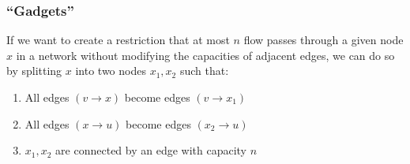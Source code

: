 \documentclass[12pt]{extarticle}
\theoremstyle{definition}
\theoremstyle{remark}
\begin{document}
\begin{center}
\end{center}

\subsubsection{``Gadgets''}
If we want to create a restriction that at most $n$ flow passes through a given node $x$ in a network without modifying the capacities of adjacent edges, we can do so by splitting $x$ into two nodes $x_1,x_2$ such that:\begin{enumerate}
    \item All edges $(v\to x)$ become edges $(v\to x_1)$
    \item All edges $(x\to u)$ become edges $(x_2\to u)$
    \item $x_1,x_2$ are connected by an edge with capacity $n$
\end{enumerate}
\end{document}
